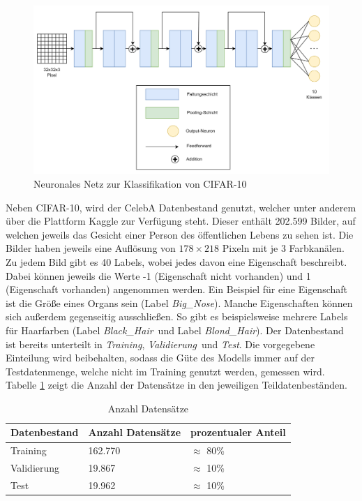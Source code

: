 \begin{figure}[!htb]
    \centering
    \includegraphics[width=15cm]{figures/cifar_modell.png}
    \caption{Neuronales Netz zur Klassifikation von CIFAR-10}
    \label{fig:cifar_modell}
\end{figure} 

Neben CIFAR-10, wird der CelebA Datenbestand \cite{celeba} genutzt, welcher unter anderem über die Plattform Kaggle zur Verfügung steht.
Dieser enthält 202.599 Bilder, auf welchen jeweils das Gesicht einer Person des öffentlichen Lebens zu sehen ist.
Die Bilder haben jeweils eine Auflösung von $178\times218$ Pixeln mit je 3 Farbkanälen.
Zu jedem Bild gibt es 40 Labels, wobei jedes davon eine Eigenschaft beschreibt. 
Dabei können jeweils die Werte -1 (Eigenschaft nicht vorhanden) und 1 (Eigenschaft vorhanden) angenommen werden.
Ein Beispiel für eine Eigenschaft ist die Größe eines Organs sein (Label \dq \textit{Big\_Nose}\dq).
Manche Eigenschaften können sich außerdem gegenseitig ausschließen.
So gibt es beispielsweise mehrere Labels für Haarfarben (Label \dq \textit{Black\_Hair}\dq\ und Label \dq \textit{Blond\_Hair}\dq).
Der Datenbestand ist bereits unterteilt in \dq \textit{Training}\dq, \dq \textit{Validierung}\dq\ und \dq \textit{Test}\dq.
Die vorgegebene Einteilung wird beibehalten, sodass die Güte des Modells immer auf der Testdatenmenge, welche nicht im Training genutzt werden, gemessen wird.
Tabelle \ref{tab:anzahl_datensaetze} zeigt die Anzahl der Datensätze in den jeweiligen Teildatenbeständen.

\begin{table}[!htb]
\centering
\begin{tabular}{|l|l|l|}
\hline
\rowcolor[HTML]{CBCEFB} 
{\color[HTML]{000000} Datenbestand} & Anzahl Datensätze  & prozentualer Anteil\\ \hline
Training & 162.770  &     $\approx$ 80\%  \\ \hline
Validierung & 19.867 &     $\approx$ 10\%      \\ \hline
Test  & 19.962 &    $\approx$ 10\%    \\ \hline

\end{tabular}
\caption{Anzahl Datensätze}
\label{tab:anzahl_datensaetze}
\end{table}

